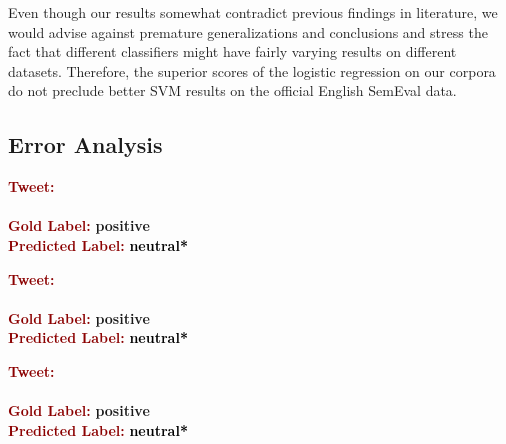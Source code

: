 Even though our results somewhat contradict previous findings in
literature, we would advise against premature generalizations and
conclusions and stress the fact that different classifiers might have
fairly varying results on different datasets.  Therefore, the superior
scores of the logistic regression on our corpora do not preclude
better SVM results on the official English SemEval data.

\subsection{Error Analysis}\label{subsec:cgsa:ml-methods:err-analysis}

\begin{example}\label{snt:cgsa:exmp:gamon-error}
  \noindent\textup{\bfseries\textcolor{darkred}{Tweet:}} {\upshape }\\
  \noindent \\[\exampleSep]
  \noindent\textup{\bfseries\textcolor{darkred}{Gold Label:}}\hspace*{4.3em}\textbf{%
    \upshape\textcolor{green3}{positive}}\\
 \noindent\textup{\bfseries\textcolor{darkred}{Predicted Label:}}\hspace*{2em}\textbf{%
    \upshape\textcolor{black}{neutral*}}
\end{example}

\begin{example}\label{snt:cgsa:exmp:mohammad-error}
  \noindent\textup{\bfseries\textcolor{darkred}{Tweet:}} {\upshape }\\
  \noindent \\[\exampleSep]
  \noindent\textup{\bfseries\textcolor{darkred}{Gold Label:}}\hspace*{4.3em}\textbf{%
    \upshape\textcolor{green3}{positive}}\\
 \noindent\textup{\bfseries\textcolor{darkred}{Predicted Label:}}\hspace*{2em}\textbf{%
    \upshape\textcolor{black}{neutral*}}
\end{example}

\begin{example}\label{snt:cgsa:exmp:guenther-error}
  \noindent\textup{\bfseries\textcolor{darkred}{Tweet:}} {\upshape }\\
  \noindent \\[\exampleSep]
  \noindent\textup{\bfseries\textcolor{darkred}{Gold Label:}}\hspace*{4.3em}\textbf{%
    \upshape\textcolor{green3}{positive}}\\
 \noindent\textup{\bfseries\textcolor{darkred}{Predicted Label:}}\hspace*{2em}\textbf{%
    \upshape\textcolor{black}{neutral*}}
\end{example}

